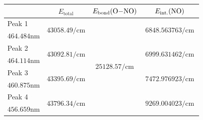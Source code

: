 \documentclass[aspectratio=43,scheme=plain]{ctexbeamer}
\begin{document}
	\begin{frame}{\insertsubsection}
		\begin{table}[htbp]
			\centering
			\tiny
			\begin{tabularx}{0.9\textwidth}{lccc}				
				& $E_\text{total}$ & $E_\text{bond}(\ce{O-NO})$ \footfullcite{ono}& $E_\text{int.}(\ce{NO})$ \\
				\toprule
				Peak 1 & \multirow{2}[2]{*}{$\num{43058.49}\unit{\per \centi \meter}$} & \multirow{8}[8]{*}{$\num{25128.57}\unit{\per \centi \meter}$} & \multirow{2}[2]{*}{\qquad\qquad\,\;\;$\num{6848.563763}\unit{\per \centi \meter}$\qquad\qquad\,\;\;} \\
				$\num{464.484}\unit{\nano\meter}$ & & & \\
				\cmidrule{1-2}\cmidrule{4-4}
				Peak 2 & \multirow{2}[2]{*}{$\num{43092.81}\unit{\per \centi \meter}$} & & \multirow{2}[2]{*}{$\num{6999.631462}\unit{\per \centi \meter}$} \\
				$\num{464.114}\unit{\nano\meter}$ & & & \\
				\cmidrule{1-2}\cmidrule{4-4}
				Peak 3 & \multirow{2}[2]{*}{$\num{43395.69}\unit{\per \centi \meter}$} & & \multirow{2}[2]{*}{$\num{7472.976923}\unit{\per \centi \meter}$} \\
				$\num{460.875}\unit{\nano\meter}$ & & & \\
				\cmidrule{1-2}\cmidrule{4-4}
				Peak 4 & \multirow{2}[2]{*}{$\num{43796.34}\unit{\per \centi \meter}$} & & \multirow{2}[2]{*}{$\num{9269.004023}\unit{\per \centi \meter}$} \\
				$\num{456.659}\unit{\nano\meter}$ & & & \\
				\bottomrule
			\end{tabularx}
		\end{table}
	\end{frame}
\end{document}
